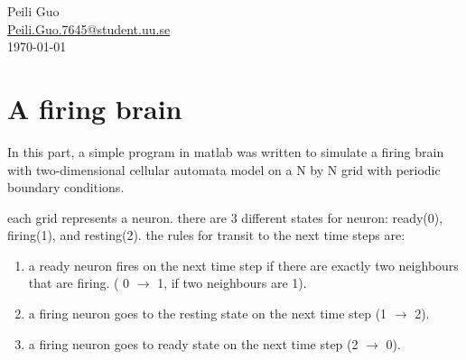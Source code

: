 \documentclass[12pt]{article}
\begin{document}
\begin{titlepage}

{\huge Peili Guo\\} %
{\large \href{mailto:Peili.Guo.7645@student.uu.se}{Peili.Guo.7645@student.uu.se}}
\\[2cm] %


{\Large \today}\\[2cm] %



\vfill %

\end{titlepage}

\newpage

\section{A firing brain}
\doublespacing
In this part, a simple program in matlab was written to simulate a firing brain with two-dimensional cellular automata model on a N by N grid with periodic boundary conditions.\par

each grid represents a neuron. there are 3 different states for neuron: ready(0), firing(1), and resting(2). 
the rules for transit to the next time steps are:

\begin{enumerate}
\item a ready neuron fires on the next time step if there are exactly two neighbours that are firing. ( 0 $\rightarrow$ 1, if two neighbours are 1).
\item a firing neuron goes to the resting state on the next time step (1 $\rightarrow$ 2).
\item a firing neuron goes to ready state on the next time step (2 $\rightarrow$ 0).
\end{enumerate}
\end{document}
